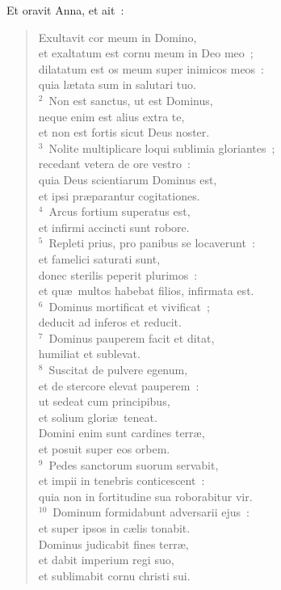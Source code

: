  Et oravit Anna, et ait~:
\begin{flushleft}\begin{verse}\vspace{-19pt}Exultavit cor meum in Domino,\\ et exaltatum est cornu meum in Deo meo~;\\ dilatatum est os meum super inimicos meos~:\\ quia l\ae tata sum in salutari tuo.\\
${}^{2}$~Non est sanctus, ut est Dominus,\\ neque enim est alius extra te,\\ et non est fortis sicut Deus noster.\\
${}^{3}$~Nolite multiplicare loqui sublimia gloriantes~;\\ recedant vetera de ore vestro~:\\ quia Deus scientiarum Dominus est,\\ et ipsi pr\ae parantur cogitationes.\\
${}^{4}$~Arcus fortium superatus est,\\ et infirmi accincti sunt robore.\\
${}^{5}$~Repleti prius, pro panibus se locaverunt~:\\ et famelici saturati sunt,\\ donec sterilis peperit plurimos~:\\ et qu\ae\ multos habebat filios, infirmata est.\\
${}^{6}$~Dominus mortificat et vivificat~;\\ deducit ad inferos et reducit.\\
${}^{7}$~Dominus pauperem facit et ditat,\\ humiliat et sublevat.\\
${}^{8}$~Suscitat de pulvere egenum,\\ et de stercore elevat pauperem~:\\ ut sedeat cum principibus,\\ et solium glori\ae\ teneat.\\ Domini enim sunt cardines terr\ae ,\\ et posuit super eos orbem.\\
${}^{9}$~Pedes sanctorum suorum servabit,\\ et impii in tenebris conticescent~:\\ quia non in fortitudine sua roborabitur vir.\\
${}^{10}$~Dominum formidabunt adversarii ejus~:\\ et super ipsos in c\ae lis tonabit.\\ Dominus judicabit fines terr\ae ,\\ et dabit imperium regi suo,\\ et sublimabit cornu christi sui.\end{verse}\end{flushleft}



